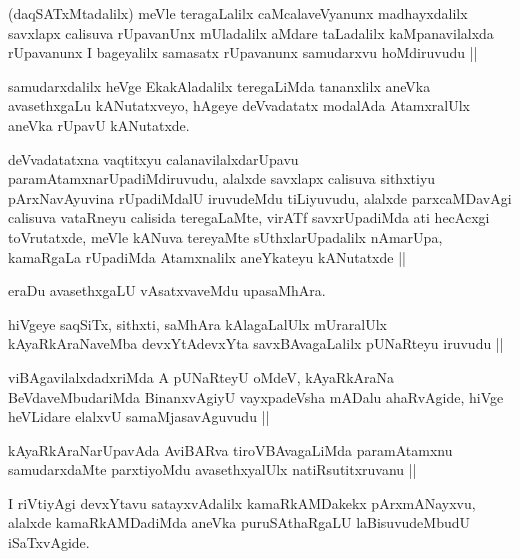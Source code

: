 \begin{artha}
(daqSATxMtadalilx) meVle teragaLalilx caMcalaveVyanunx madhayxdalilx savxlapx calisuva rUpavanUnx mUladalilx aMdare taLadalilx kaMpanavilalxda rUpavanunx I bageyalilx samasatx rUpavanunx samudarxvu hoMdiruvudu ||
\end{artha}

\begin{artha}
samudarxdalilx heVge EkakAladalilx teregaLiMda tananxlilx aneVka avasethxgaLu kANutatxveyo, hAgeye deVvadatatx modalAda AtamxralUlx aneVka rUpavU kANutatxde.
\end{artha}


\begin{artha}
deVvadatatxna vaqtitxyu calanavilalxdarUpavu paramAtamxnarUpadiMdiruvudu, alalxde savxlapx calisuva sithxtiyu pArxNavAyuvina rUpadiMdalU iruvudeMdu tiLiyuvudu, alalxde parxcaMDavAgi calisuva vataRneyu calisida teregaLaMte, virATf savxrUpadiMda ati hecAcxgi toVrutatxde, meVle kANuva tereyaMte sUthxlarUpadalilx nAmarUpa, kamaRgaLa rUpadiMda Atamxnalilx aneYkateyu kANutatxde ||
\end{artha}

\begin{artha}
eraDu avasethxgaLU vAsatxvaveMdu upasaMhAra.
\end{artha}

\begin{artha}
hiVgeye saqSiTx, sithxti, saMhAra kAlagaLalUlx mUraralUlx kAyaRkAraNaveMba devxYtAdevxYta savxBAvagaLalilx pUNaRteyu iruvudu ||
\end{artha}

\begin{artha}
viBAgavilalxdadxriMda A pUNaRteyU oMdeV, kAyaRkAraNa BeVdaveMbudariMda BinanxvAgiyU vayxpadeVsha mADalu ahaRvAgide, hiVge heVLidare elalxvU samaMjasavAguvudu ||
\end{artha}

\begin{artha}
kAyaRkAraNarUpavAda AviBARva tiroVBAvagaLiMda paramAtamxnu samudarxdaMte parxtiyoMdu avasethxyalUlx natiRsutitxruvanu ||
\end{artha}

\begin{artha}
I riVtiyAgi devxYtavu satayxvAdalilx kamaRkAMDakekx pArxmANayxvu, alalxde kamaRkAMDadiMda aneVka puruSAthaRgaLU laBisuvudeMbudU iSaTxvAgide.
\end{artha}

